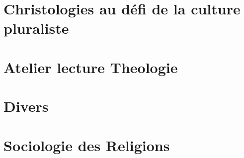 \documentclass[oneside,10pt]{book} %
\begin{document}
 

 
\part{Christologies au défi de la culture pluraliste}




 




  \part{Atelier lecture Theologie}
 
 
 
  
  
    
  
 

 
 
 
 \part{Divers}





 \part{Sociologie des Religions}
 
 
  
 
 
 
  
  
 

\end{document}
